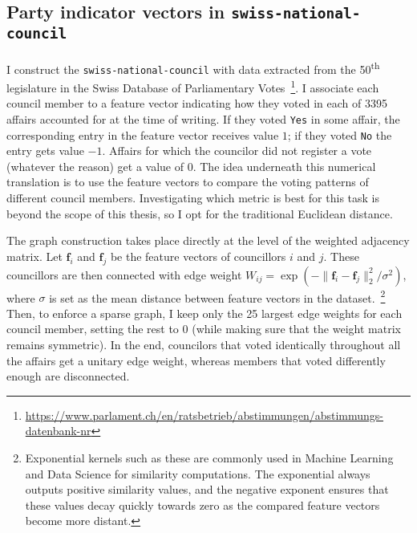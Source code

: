 \subsection{Party indicator vectors in \texttt{swiss-national-council}}

I construct the \texttt{swiss-national-council} with data extracted from the 50\textsuperscript{th} legislature in the Swiss Database of Parliamentary Votes~\footnote{\url{https://www.parlament.ch/en/ratsbetrieb/abstimmungen/abstimmungs-datenbank-nr}}. I associate each council member to a feature vector indicating how they voted in each of 3395 affairs accounted for at the time of writing. If they voted \texttt{Yes} in some affair, the corresponding entry in the feature vector receives value $1$; if they voted \texttt{No} the entry gets value $-1$. Affairs for which the councilor did not register a vote (whatever the reason) get a value of $0$. The idea underneath this numerical translation is to use the feature vectors to compare the voting patterns of different council members. Investigating which metric is best for this task is beyond the scope of this thesis, so I opt for the traditional Euclidean distance.

The graph construction takes place directly at the level of the weighted adjacency matrix. Let $\mathbf{f}_i$ and $\mathbf{f}_j$ be the feature vectors of councillors $i$ and $j$. These councillors are then connected with edge weight $W_{ij} = \exp \left ( -\| \mathbf{f}_i - \mathbf{f}_j \|_2^2 / \sigma^2 \right )$, where $\sigma$ is set as the mean distance between feature vectors in the dataset.~\footnote{Exponential kernels such as these are commonly used in Machine Learning and Data Science for similarity computations. The exponential always outputs positive similarity values, and the negative exponent ensures that these values decay quickly towards zero as the compared feature vectors become more distant.} Then, to enforce a sparse graph, I keep only the 25 largest edge weights for each council member, setting the rest to $0$ (while making sure that the weight matrix remains symmetric). In the end, councilors that voted identically throughout all the affairs get a unitary edge weight, whereas members that voted differently enough are disconnected.

